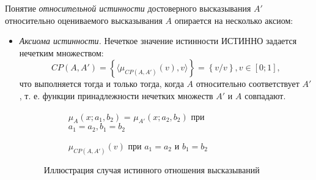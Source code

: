 Понятие \textit{относительной истинности} достоверного высказывания $A'$ относительно оцениваемого высказывания $A$ опирается на несколько аксиом:
\begin{itemize}
\item \textit{Аксиома истинности.} Нечеткое значение истинности ИСТИННО задается нечетким множеством:
\begin{equation*} 
CP(A,A') = \left\{\langle\mu_{CP(A,A')}(v), v\rangle\right\} = \left\{v/v\right\}, v \in [0; 1],
\end{equation*}
что выполняется тогда и только тогда, когда $A$ относительно соответствует $A'$, т. е. функции принадлежности нечетких множеств $A'$ и $A$ совпадают.


\begin{figure}[ht]
	\newcommand{\aOne}{0.5}
	\newcommand{\bOne}{0.05}
	\newcommand{\aTwo}{0.5}
	\newcommand{\bTwo}{0.05}
	\begin{subfigure}[t]{0.5\textwidth}
		\caption{$\mu_A(x; a_1, b_2)$ = $\mu_{A'}(x; a_2, b_2)$ при $a_1 = a_2, b_1 = b_2$}
	\end{subfigure}
	\hfill
	\begin{subfigure}[t]{0.5\textwidth}
		\caption{$\mu_{CP(A,A')}(v)$ при $a_1 = a_2$ и $b_1 = b_2$}
	\end{subfigure}
	\caption{Иллюстрация случая истинного отношения высказываний}
	\label{fig:ftv-gauss-true}
\end{figure}


\end{itemize}
